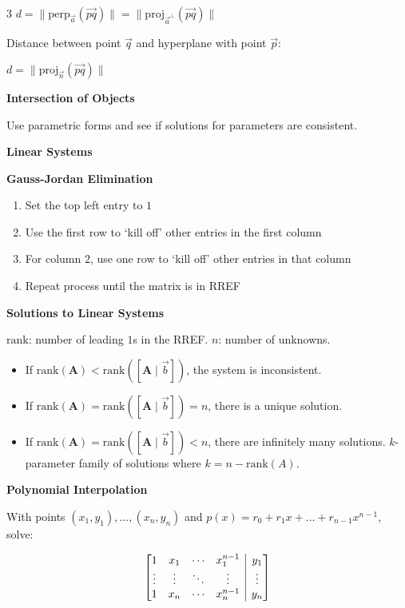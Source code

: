 \documentclass[10pt]{article}
\makeatletter
\newcommand{\proj}{\mathrm{proj}}
\newcommand{\rank}{\mathrm{rank}}
\newcommand\norm[1]{\lVert#1\rVert}
\newcommand\vect[1]{\overrightarrow{#1}}
\newenvironment{amatrix}[1]{\left[\begin{array}{@{}*{#1}{c}|c@{}}}{\end{array}\right]}
\newcommand{\matr}[1]{\mathbf{#1}}
\newcommand\sectionheading[1]{\begin{center}\large{\textbf{#1}}\end{center}\normalsize}
\newcommand\heading[1]{\medskip\textbf{#1}\medskip}
\makeatother
\begin{document}
\begin{multicols*}{3}
$d=\norm{\mathrm{perp}_{\vec a}(\vect{pq})}=\norm{\proj_{\vec a^\perp}(\vect{pq})}$

Distance between point $\vec q$ and hyperplane with point $\vec p$:

$d=\norm{\proj_{\vec n}(\vect{pq})}$

\heading{Intersection of Objects}

Use parametric forms and see if solutions for parameters are consistent.

\sectionheading{Linear Systems}

\heading{Gauss-Jordan Elimination}

\begin{enumerate}[noitemsep,topsep=0pt]
    \item Set the top left entry to $1$
    \item Use the first row to `kill off' other entries in the first column
    \item For column $2$, use one row to `kill off' other entries in that column
    \item Repeat process until the matrix is in RREF
\end{enumerate}

\heading{Solutions to Linear Systems}

$\rank$: number of leading $1$s in the RREF. $n$: number of unknowns.

\begin{itemize}[noitemsep,topsep=0pt]
    \item If $\rank(\matr{A})<\rank([\matr{A}\mid\vec b])$, the system is inconsistent.
    \item If $\rank(\matr{A})=\rank([\matr{A}\mid\vec b])=n$, there is a unique solution.
    \item If $\rank(\matr{A})=\rank([\matr{A}\mid\vec b])<n$, there are infinitely many solutions. $k$-parameter family of solutions where $k=n-\rank(A)$.
\end{itemize}

\heading{Polynomial Interpolation}

With points $(x_1,y_1),\ldots,(x_n,y_n)$ and $p(x)=r_0+r_1x+\dots+r_{n-1}x^{n-1}$, solve:

\[\begin{amatrix}{4}
    1 & x_1 & \cdots & x_1^{n-1} & y_1 \\
    \vdots & \vdots & \ddots & \vdots & \vdots \\
    1 & x_n & \cdots & x_n^{n-1} & y_n
\end{amatrix}\]


\end{multicols*}
\end{document}
